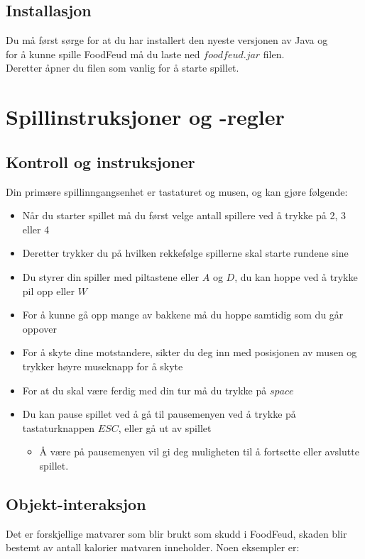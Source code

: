 \documentclass[paper=a4]{article}
\begin{document}
\subsection{Installasjon}
Du må først sørge for at du har installert den nyeste versjonen av Java og \\
for å kunne spille FoodFeud må du laste ned $foodfeud.jar$ filen. \\
Deretter åpner du filen som vanlig for å starte spillet.  
\newpage

\section{Spillinstruksjoner og -regler}

\subsection{Kontroll og instruksjoner}
Din primære spillinngangsenhet er tastaturet og musen, og kan gjøre følgende:
\begin{itemize}
	\item{Når du starter spillet må du først velge antall spillere ved å trykke på 2, 3 eller 4}
	\item{Deretter trykker du på hvilken rekkefølge spillerne skal starte rundene sine}
	\item{Du styrer din spiller med piltastene eller $A$ og $D$, du kan hoppe ved å trykke pil opp eller $W$}
	\item{For å kunne gå opp mange av bakkene må du hoppe samtidig som du går oppover}
	\item{For å skyte dine motstandere, sikter du deg inn med posisjonen av musen og trykker høyre museknapp for å skyte}
	\item{For at du skal være ferdig med din tur må du trykke på $space$} %
	\item{Du kan pause spillet ved å gå til pausemenyen ved å trykke på tastaturknappen $ESC$, eller gå ut av spillet}
	\begin{itemize}
		\item{Å være på pausemenyen vil gi deg muligheten til å fortsette eller avslutte spillet.}
	\end{itemize}
\end{itemize}

\subsection{Objekt-interaksjon}
Det er forskjellige matvarer som blir brukt som skudd i FoodFeud, skaden blir bestemt av antall kalorier matvaren inneholder. Noen eksempler er:
\end{document}
